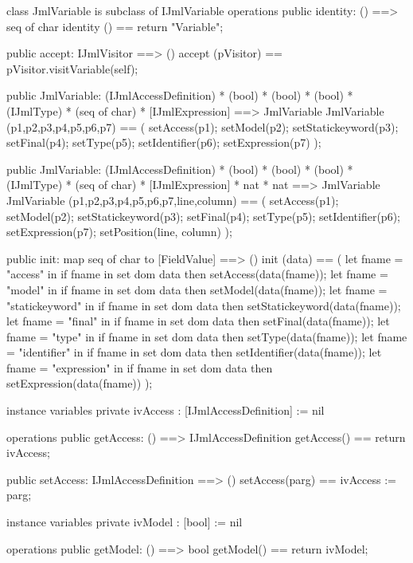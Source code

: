 \begin{vdm_al}
class JmlVariable is subclass of IJmlVariable
operations
  public identity: () ==> seq of char
  identity () == return "Variable";

  public accept: IJmlVisitor ==> ()
  accept (pVisitor) == pVisitor.visitVariable(self);

  public JmlVariable:
    (IJmlAccessDefinition) *
    (bool) *
    (bool) *
    (bool) *
    (IJmlType) *
    (seq of char) *
    [IJmlExpression] ==> JmlVariable
  JmlVariable (p1,p2,p3,p4,p5,p6,p7) == 
    ( setAccess(p1);
      setModel(p2);
      setStatickeyword(p3);
      setFinal(p4);
      setType(p5);
      setIdentifier(p6);
      setExpression(p7) );

  public JmlVariable:
    (IJmlAccessDefinition) *
    (bool) *
    (bool) *
    (bool) *
    (IJmlType) *
    (seq of char) *
    [IJmlExpression] *
    nat *
    nat ==> JmlVariable
  JmlVariable (p1,p2,p3,p4,p5,p6,p7,line,column) == 
    ( setAccess(p1);
      setModel(p2);
      setStatickeyword(p3);
      setFinal(p4);
      setType(p5);
      setIdentifier(p6);
      setExpression(p7);
      setPosition(line, column) );

  public init: map seq of char to [FieldValue] ==> ()
  init (data) ==
    ( let fname = "access" in
        if fname in set dom data
        then setAccess(data(fname));
      let fname = "model" in
        if fname in set dom data
        then setModel(data(fname));
      let fname = "statickeyword" in
        if fname in set dom data
        then setStatickeyword(data(fname));
      let fname = "final" in
        if fname in set dom data
        then setFinal(data(fname));
      let fname = "type" in
        if fname in set dom data
        then setType(data(fname));
      let fname = "identifier" in
        if fname in set dom data
        then setIdentifier(data(fname));
      let fname = "expression" in
        if fname in set dom data
        then setExpression(data(fname)) );

instance variables
  private ivAccess : [IJmlAccessDefinition] := nil

operations
  public getAccess: () ==> IJmlAccessDefinition
  getAccess() == return ivAccess;

  public setAccess: IJmlAccessDefinition ==> ()
  setAccess(parg) == ivAccess := parg;

instance variables
  private ivModel : [bool] := nil

operations
  public getModel: () ==> bool
  getModel() == return ivModel;


\end{vdm_al}
